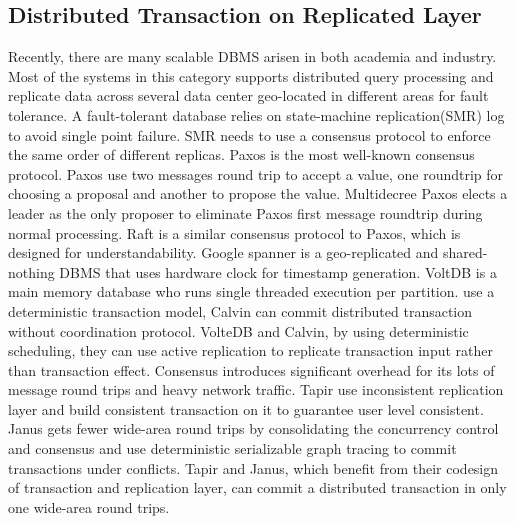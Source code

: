 \documentclass[conference]{IEEEtran}
\begin{document}
\subsection{Distributed Transaction on Replicated Layer}
Recently, there are many scalable DBMS arisen in both academia and industry.
Most of the systems in this category supports distributed query processing and
replicate data across several data center geo-located in different areas for fault tolerance.
A fault-tolerant database relies on state-machine replication(SMR) log to avoid single point failure.
SMR needs to use a consensus protocol to enforce the same order of different replicas.
Paxos\cite{Paxos:journals/tocs/Lamport98}\cite{PaxosSimple:conf/opodis/Lamport02} is the most well-known consensus protocol.
Paxos use two messages round trip to accept a value, one roundtrip for choosing a proposal and another to propose the value.
Multidecree Paxos\cite{Multidecree:journals/csur/RenesseA15} elects a leader as the only proposer to eliminate Paxos first message roundtrip during normal processing.
Raft\cite{Raft:conf/usenix/OngaroO14} is a similar consensus protocol to Paxos, which is designed for understandability.
Google spanner \cite{Spanner:conf/osdi/CorbettDEFFFGGHHHKKLLMMNQRRSSTWW12}\cite{Spanner:conf/sigmod/BaconBBCDFFGJKL17} is a geo-replicated and shared-nothing DBMS that uses hardware clock for timestamp generation.
VoltDB \cite{VoltDB} is a main memory database who runs single threaded execution per partition.
\cite{Calvin:conf/sigmod/ThomsonDWRSA12} use a deterministic transaction model, 
Calvin can commit distributed transaction without coordination protocol.
VolteDB and Calvin, by using deterministic scheduling, they can use active replication to replicate transaction input rather than transaction effect.
Consensus introduces significant overhead for its lots of message round trips and heavy network traffic.
Tapir\cite{Tapir:conf/sosp/ZhangSSKP15} use inconsistent replication layer and build consistent transaction on it to guarantee user level consistent.
Janus\cite{Janus:conf/osdi/MuNLL16} gets fewer wide-area  round trips 
by consolidating the concurrency control and consensus
and use deterministic serializable graph tracing to commit transactions under conflicts.
Tapir and Janus, which benefit from their codesign of transaction and replication layer, can commit a distributed transaction in only one wide-area round trips.
\end{document}
